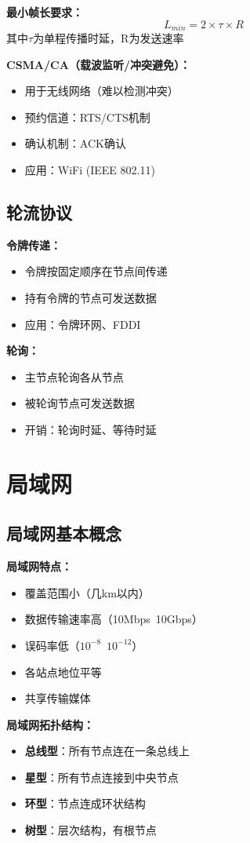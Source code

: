 \documentclass[lang=cn,newtx,10pt,scheme=chinese]{../../elegantbook}
\begin{document}
\textbf{最小帧长要求：}
\[
L_{min} = 2 \times \tau \times R
\]
其中$\tau$为单程传播时延，R为发送速率

\textbf{CSMA/CA（载波监听/冲突避免）：}
\begin{itemize}
  \item 用于无线网络（难以检测冲突）
  \item 预约信道：RTS/CTS机制
  \item 确认机制：ACK确认
  \item 应用：WiFi (IEEE 802.11)
\end{itemize}

\subsection{轮流协议}

\textbf{令牌传递：}
\begin{itemize}
  \item 令牌按固定顺序在节点间传递
  \item 持有令牌的节点可发送数据
  \item 应用：令牌环网、FDDI
\end{itemize}

\textbf{轮询：}
\begin{itemize}
  \item 主节点轮询各从节点
  \item 被轮询节点可发送数据
  \item 开销：轮询时延、等待时延
\end{itemize}

\section{局域网}

\subsection{局域网基本概念}

\textbf{局域网特点：}
\begin{itemize}
  \item 覆盖范围小（几km以内）
  \item 数据传输速率高（10Mbps~10Gbps）
  \item 误码率低（$10^{-8}$~$10^{-12}$）
  \item 各站点地位平等
  \item 共享传输媒体
\end{itemize}

\textbf{局域网拓扑结构：}
\begin{itemize}
  \item \textbf{总线型}：所有节点连在一条总线上
  \item \textbf{星型}：所有节点连接到中央节点
  \item \textbf{环型}：节点连成环状结构
  \item \textbf{树型}：层次结构，有根节点
\end{itemize}
\end{document}
